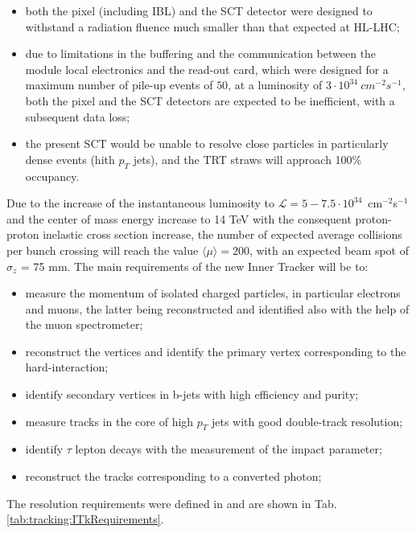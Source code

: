 \documentclass[a4paper,twoside,12pt]{book}
\begin{document}
\begin{itemize}
\item both the pixel (including IBL) and the SCT detector were designed to withstand a radiation fluence much smaller
than that expected at HL-LHC;
\item due to limitations in the buffering and the communication between the module local electronics and the read-out card, which
were designed for a maximum number of pile-up events of $50$,
at a luminosity of $3 \cdot 10^{34}\ cm^{-2}s^{-1}$, both the pixel and the SCT detectors are expected to be inefficient, with
a subsequent data loss;
\item the present SCT would be unable to resolve close particles in particularly dense events (hith $p_{T}$ jets), and the TRT straws
	will approach 100\% occupancy.
\end{itemize}

Due to the increase of the instantaneous luminosity to \mbox{$\mathcal{L} = 5 - 7.5 \cdot 10^{34}$ cm$^{-2}$s$^{-1}$} and the center of mass energy increase to 
14 TeV with the consequent proton-proton inelastic cross section increase, the number of expected average collisions per bunch crossing will 
reach the value $\langle\mu\rangle = 200$, with an expected beam spot of $\sigma_{z}$ = 75 mm. The main requirements of the new Inner Tracker will be to:

\begin{itemize}
\item measure the momentum of isolated charged particles, in particular electrons and muons, the latter being reconstructed and identified also with
the help of the muon spectrometer;
\item reconstruct the vertices and identify the primary vertex corresponding to the hard-interaction;
\item identify secondary vertices in b-jets with high efficiency and purity;
\item measure tracks in the core of high $p_{T}$ jets with good double-track resolution;
\item identify $\tau$ lepton decays with the measurement of the impact parameter;
\item reconstruct the tracks corresponding to a converted photon;
\end{itemize}

The resolution requirements were defined in \cite{PerformanceRequirements} and are
shown in Tab.\ref{tab:tracking:ITkRequirements}.\\
\end{document}
